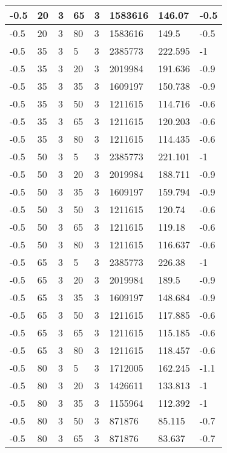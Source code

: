 \begin{longtable}{|p{1.4cm}|p{1.4cm}|p{1.4cm}|p{1.4cm}|p{1.4cm}|p{1.4cm}|p{1.4cm}|p{1.5cm}|}
        -0.5 & 20 & 3 & 65 & 3 & 1583616 & 146.07 & -0.5 \\ \hline
        -0.5 & 20 & 3 & 80 & 3 & 1583616 & 149.5 & -0.5 \\ \hline
        -0.5 & 35 & 3 & 5 & 3 & 2385773 & 222.595 & -1 \\ \hline
        -0.5 & 35 & 3 & 20 & 3 & 2019984 & 191.636 & -0.9 \\ \hline
        -0.5 & 35 & 3 & 35 & 3 & 1609197 & 150.738 & -0.9 \\ \hline
        -0.5 & 35 & 3 & 50 & 3 & 1211615 & 114.716 & -0.6 \\ \hline
        -0.5 & 35 & 3 & 65 & 3 & 1211615 & 120.203 & -0.6 \\ \hline
        -0.5 & 35 & 3 & 80 & 3 & 1211615 & 114.435 & -0.6 \\ \hline
        -0.5 & 50 & 3 & 5 & 3 & 2385773 & 221.101 & -1 \\ \hline
        -0.5 & 50 & 3 & 20 & 3 & 2019984 & 188.711 & -0.9 \\ \hline
        -0.5 & 50 & 3 & 35 & 3 & 1609197 & 159.794 & -0.9 \\ \hline
        -0.5 & 50 & 3 & 50 & 3 & 1211615 & 120.74 & -0.6 \\ \hline
        -0.5 & 50 & 3 & 65 & 3 & 1211615 & 119.18 & -0.6 \\ \hline
        -0.5 & 50 & 3 & 80 & 3 & 1211615 & 116.637 & -0.6 \\ \hline
        -0.5 & 65 & 3 & 5 & 3 & 2385773 & 226.38 & -1 \\ \hline
        -0.5 & 65 & 3 & 20 & 3 & 2019984 & 189.5 & -0.9 \\ \hline
        -0.5 & 65 & 3 & 35 & 3 & 1609197 & 148.684 & -0.9 \\ \hline
        -0.5 & 65 & 3 & 50 & 3 & 1211615 & 117.885 & -0.6 \\ \hline
        -0.5 & 65 & 3 & 65 & 3 & 1211615 & 115.185 & -0.6 \\ \hline
        -0.5 & 65 & 3 & 80 & 3 & 1211615 & 118.457 & -0.6 \\ \hline
        -0.5 & 80 & 3 & 5 & 3 & 1712005 & 162.245 & -1.1 \\ \hline
        -0.5 & 80 & 3 & 20 & 3 & 1426611 & 133.813 & -1 \\ \hline
        -0.5 & 80 & 3 & 35 & 3 & 1155964 & 112.392 & -1 \\ \hline
        -0.5 & 80 & 3 & 50 & 3 & 871876 & 85.115 & -0.7 \\ \hline
        -0.5 & 80 & 3 & 65 & 3 & 871876 & 83.637 & -0.7 \\ \hline

\end{longtable}
